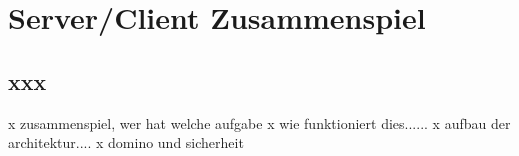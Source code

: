 \chapter{Server/Client Zusammenspiel}

\section{xxx}
\label{sec:5serverclient}

x zusammenspiel, wer hat welche aufgabe 
x wie funktioniert dies......
x aufbau der architektur....
x domino und sicherheit